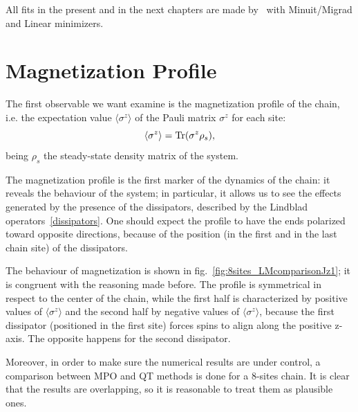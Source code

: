 All fits in the present and in the next chapters are made by~\cite{root_cern} with Minuit/Migrad and Linear minimizers.

\section{Magnetization Profile}
\label{sec:magn_profile}
The first observable we want examine is the magnetization profile of the chain, i.e. the expectation value $\langle \sigma^z \rangle$ of the Pauli matrix $\sigma^z$ for each site:
\begin{equation*}
    \langle \sigma^z \rangle = \operatorname{Tr}(\sigma^z \rho_s),
\end{equation*}
being $\rho_s$ the steady-state density matrix of the system.

The magnetization profile is the first marker of the dynamics of the chain: it reveals the behaviour of the system; in particular, it allows us to see the effects generated by the presence of the dissipators, described by the Lindblad operators~\ref{dissipators}. One should expect the profile to have the ends polarized toward opposite directions, because of the position (in the first and in the last chain site) of the dissipators.


The behaviour of magnetization is shown in fig.~\ref{fig:8sites_LMcomparisonJz1}; it is congruent with the reasoning made before. The profile is symmetrical in respect to the center of the chain, while the first half is characterized by positive values of  $\langle \sigma^z \rangle$ and the second half by negative values of $\langle \sigma^z \rangle$, because the first dissipator (positioned in the first site) forces spins to align along the positive z-axis. The opposite happens for the second dissipator.

Moreover, in order to make sure the numerical results are under control, a comparison between MPO and QT methods is done for a 8-sites chain. It is clear that the results are overlapping, so it is reasonable to treat them as plausible ones.

